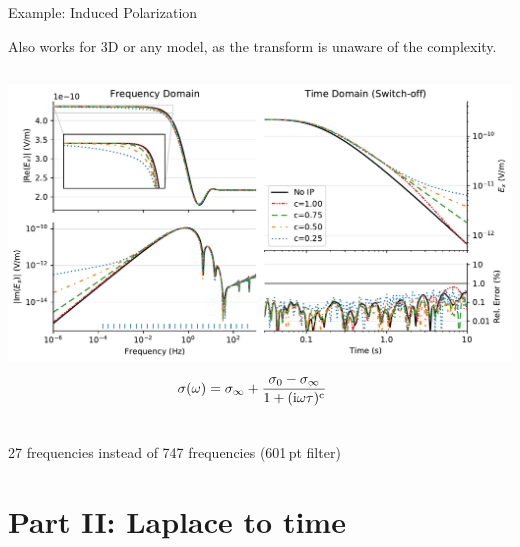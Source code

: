 \documentclass[xcolor=svgnames, usepdftitle=false, aspectratio=169]{beamer}
\newcommand{\ato}{\addtocounter{framenumber}{1}}
\begin{document}
\begin{frame}
  {Example: Induced Polarization}

  Also works for 3D or any model, as the transform is unaware of the
  complexity.

  \begin{columns}
      \includegraphics[width=\linewidth]{11-cole-cole-model}
      \begin{equation}
       ~\hspace{-.5cm} \sigma(\omega) = \sigma_\infty + \frac{\sigma_0 - \sigma_\infty}{1 +
          (\rm{i}\omega\tau)^c}
          \nonumber
      \end{equation}
  \end{columns}

  27 frequencies instead of 747 frequencies (601\,pt filter)

\end{frame}

\ato
\section{Part II: Laplace to time} %
\end{document}

